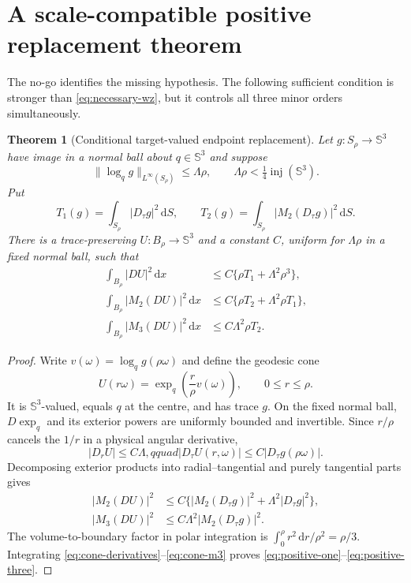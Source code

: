 \documentclass[11pt]{article}
\newtheorem{theorem}{Theorem}[section]
\newcommand{\dd}{\,\mathrm d}
\newcommand{\SSS}{\mathbb S}
\begin{document}
\section{A scale-compatible positive replacement theorem}

The no-go identifies the missing hypothesis.  The following sufficient
condition is stronger than \eqref{eq:necessary-wz}, but it controls all
three minor orders simultaneously.

\begin{theorem}[Conditional target-valued endpoint replacement]
Let $g:S_\rho\to\SSS^3$ have image in a normal ball about $q\in\SSS^3$ and
suppose
\begin{equation}
 \|\log_q g\|_{L^\infty(S_\rho)}\leq\Lambda\rho,
 \qquad \Lambda\rho<\tfrac14\operatorname{inj}(\SSS^3).
 \label{eq:linear-osc}
\end{equation}
Put
\begin{equation}
 T_1(g)=\int_{S_\rho}|D_\tau g|^2\dd S,\qquad
 T_2(g)=\int_{S_\rho}|M_2(D_\tau g)|^2\dd S.
 \label{eq:trace-costs}
\end{equation}
There is a trace-preserving $U:B_\rho\to\SSS^3$ and a constant $C$,
uniform for $\Lambda\rho$ in a fixed normal ball, such that
\begin{align}
 \int_{B_\rho}|DU|^2\dd x
 &\leq C\{\rho T_1+\Lambda^2\rho^3\},
 \label{eq:positive-one}\\
 \int_{B_\rho}|M_2(DU)|^2\dd x
 &\leq C\{\rho T_2+\Lambda^2\rho T_1\},
 \label{eq:positive-two}\\
 \int_{B_\rho}|M_3(DU)|^2\dd x
 &\leq C\Lambda^2\rho T_2.
 \label{eq:positive-three}
\end{align}
\end{theorem}

\begin{proof}
Write $v(\omega)=\log_qg(\rho\omega)$ and define the geodesic cone
\begin{equation}
 U(r\omega)=\exp_q\left(\frac r\rho v(\omega)\right),
 \qquad 0\leq r\leq\rho.
 \label{eq:geodesic-cone}
\end{equation}
It is $\SSS^3$-valued, equals $q$ at the centre, and has trace $g$.  On the
fixed normal ball, $D\exp_q$ and its exterior powers are uniformly bounded
and invertible.  Since $r/\rho$ cancels the $1/r$ in a physical angular
derivative,
\begin{equation}
 |D_rU|\leq C\Lambda,qquad
 |D_\tau U(r,\omega)|\leq C|D_\tau g(\rho\omega)|.
 \label{eq:cone-derivatives}
\end{equation}
Decomposing exterior products into radial--tangential and purely tangential
parts gives
\begin{align}
 |M_2(DU)|^2
 &\leq C\{|M_2(D_\tau g)|^2+\Lambda^2|D_\tau g|^2\},
 \label{eq:cone-m2}\\
 |M_3(DU)|^2
 &\leq C\Lambda^2|M_2(D_\tau g)|^2.
 \label{eq:cone-m3}
\end{align}
The volume-to-boundary factor in polar integration is
$\int_0^\rho r^2\dd r/\rho^2=\rho/3$.  Integrating
\eqref{eq:cone-derivatives}--\eqref{eq:cone-m3} proves
\eqref{eq:positive-one}--\eqref{eq:positive-three}.
\end{proof}
\end{document}
